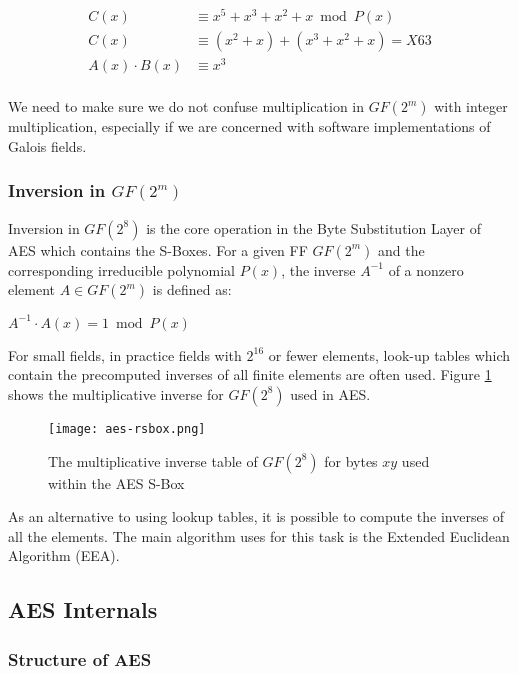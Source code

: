 \begin{center}
\begin{align*}
C(x) &\equiv x^5 + x^3 + x^2 + x \bmod P(x) \\
C(x) &\equiv (x^2 + x) + (x^3 + x^2 + x) = X63 \\
A(x) \cdot B(x) &\equiv x^3 \\
\end{align*}
\end{center}

We need to make sure we do not confuse multiplication in $GF(2^m)$ with integer multiplication, especially if we are concerned with software implementations of Galois fields.

\subsubsection{Inversion in $GF(2^m)$}

Inversion in $GF(2^8)$ is the core operation in the Byte Substitution Layer of AES which contains the S-Boxes. For a given FF $GF(2^m)$ and the corresponding irreducible polynomial $P(x)$, the inverse $A^{-1}$ of a nonzero element $A \in GF(2^m)$ is defined as:

\begin{center}
$A^{-1} \cdot A(x) = 1 \bmod P(x)$
\end{center}

For small fields, in practice fields with $2^16$ or fewer elements, look-up tables which contain the precomputed inverses of all finite elements are often used. Figure \ref{AES-RS-BOX} shows the multiplicative inverse for $GF(2^8)$ used in AES.

\begin{figure}[H]
\begin{center}
\texttt{[image: aes-rsbox.png]}
\caption{The multiplicative inverse table of $GF(2^8)$ for bytes $xy$ used within the AES S-Box}
\label{AES-RS-BOX}
\end{center}
\end{figure}

As an alternative to using lookup tables, it is possible to compute the inverses of all the elements. The main algorithm uses for this task is the Extended Euclidean Algorithm (EEA).

\subsection{AES Internals}
\subsubsection{Structure of AES}

